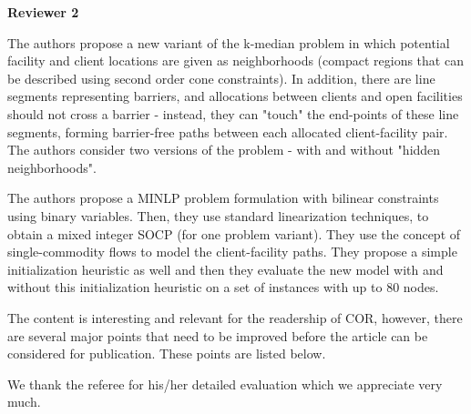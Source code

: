 \documentclass{article}
\newenvironment{reviewer}{\setcounter{pointcounter}{1}}{}
\newcommand{\point}{\text{{\selectfont \thepointcounter} \stepcounter{pointcounter}}}
\begin{document}
\begin{reviewer}
		\begin{tcolorbox}[breakable,enhanced,coltitle=black,colback=red!5!white,colframe=red!75!black,title=\textbf{Answer R1.\point},borderline={1pt}{0pt}{black},boxrule=0pt]

		\end{tcolorbox}
		
	\end{reviewer}
	
	\newpage
	\begin{reviewer}
		
		\begin{tcolorbox}[breakable,enhanced,coltitle=black,colback=green!75!black,colframe=green!75!black,borderline={1pt}{0pt}{black},boxrule=0pt]
			\textbf{Reviewer 2}
		\end{tcolorbox}
		
		\begin{itshape}
			The authors propose a new variant of the k-median problem in which potential facility and client locations are given as neighborhoods (compact regions that can be described using second order cone constraints). In addition, there are line segments representing barriers, and allocations between clients and open facilities should not cross a barrier - instead, they can "touch" the end-points of these line segments, forming barrier-free paths between each allocated client-facility pair. The authors consider two versions of the problem - with and without "hidden neighborhoods".
			
			The authors propose a MINLP problem formulation with bilinear constraints using binary variables. Then, they use standard linearization techniques, to obtain a mixed integer SOCP (for one problem variant). They use the concept of single-commodity flows to model the client-facility paths. They propose a simple initialization heuristic as well and then they evaluate the new model with and without this initialization heuristic on a set of instances with up to 80 nodes.
			
			The content is interesting and relevant for the readership of COR, however, there are several major points that need to be improved before the article can be considered for publication. These points are listed below.

		\end{itshape}
		
		\begin{tcolorbox}[breakable,enhanced,coltitle=black,colback=green!5!white,colframe=green!75!black,title=\textbf{Answer R2.\point},borderline={1pt}{0pt}{black},boxrule=0pt]
		We thank the referee for his/her detailed evaluation which we appreciate very much.
			

\end{tcolorbox}
\end{reviewer}
\end{document}
